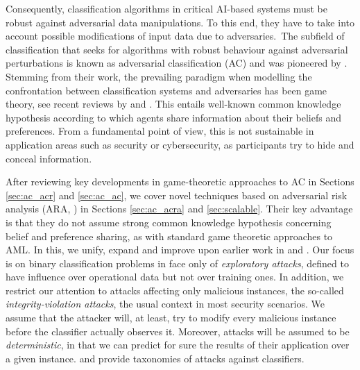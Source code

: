 Consequently, classification algorithms in critical AI-based systems must be robust against adversarial data manipulations. To this end, they have to take into account possible modifications of input data
due to adversaries.~The subfield of
classification that seeks for algorithms with robust behaviour against adversarial perturbations is known as adversarial classification (AC)
and  was pioneered by \textcite{dalvi2004adversarial}.
Stemming from their work, the prevailing paradigm 
when modelling the confrontation between classification systems and adversaries has been game theory, see recent reviews by \textcite{BIGGIO2018317} and \textcite{doi:10.1002/widm.1259}. This entails well-known common knowledge hypothesis \parencite{Antos,gameTheoryACriticalIntroduction2004} according to which agents share information about their beliefs and preferences. From a fundamental point of view, this is 
not sustainable in  application areas such as security or cybersecurity,
as participants try to
hide and conceal information.  

After reviewing key developments in game-theoretic approaches to AC in Sections \ref{sec:ac_acr} and \ref{sec:ac_ac}, we cover novel techniques based on adversarial risk analysis (ARA, \textcite{AMLARA}) in Sections  \ref{sec:ac_acra} and \ref{sec:scalable}. Their key advantage is that they do not assume strong common knowledge hypothesis concerning belief and preference sharing, as with standard game theoretic approaches to AML. In this, we unify, expand
and improve upon earlier work in \textcite{naveiro2018adversarial} and
\textcite{gallego2020protecting}.
Our focus is on binary classification
 problems in face only of {\em exploratory attacks}, defined to have influence over operational data but not over training ones. In addition, we restrict our attention to attacks affecting only malicious instances, the so-called \textit{integrity-violation attacks}, the usual context in most security scenarios. We assume that the attacker will, at least, try to modify every malicious instance before the
classifier actually observes it. 
Moreover, attacks will be assumed to be {\em deterministic},
in that we can predict for sure the results of their 
application over a given instance.
\textcite{AdversarialMachineLearning2011} and \textcite{Barreno2006} provide taxonomies of attacks against classifiers. %
%

